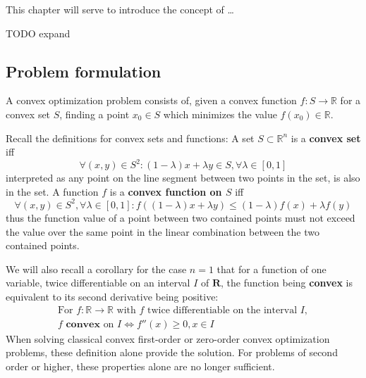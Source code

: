\documentclass[../convex_optimization.tex]{subfiles}
\theoremstyle{definition} \newtheorem{defi}{Def}
\theoremstyle{definition} \newtheorem{prop}{Prop}
\begin{document}
This chapter will serve to introduce the concept of \ldots

TODO expand

\subsection{Problem formulation}
A convex optimization problem consists of, given a convex function
$f: S \to \mathbb R$ for a convex set $S$, finding
a point $x_0 \in S$ which minimizes the value $f(x_0) \in \mathbb R$.

Recall the definitions for convex sets and functions:
A set $S \subset \mathbb R^n$ is a \textbf{convex set} iff
\begin{equation}
    \forall (x, y) \in S^2: (1-\lambda)x + \lambda y \in S,
    \forall \lambda \in [0, 1]
    \label{convex_set}
\end{equation}
interpreted as any point on the line segment between two points in the set,
is also in the set.
A function $f$ is a \textbf{convex function on $S$} iff
\begin{equation}
    \forall (x, y) \in S^2, \forall \lambda \in [0, 1]:
    f((1-\lambda)x + \lambda y) \leq (1-\lambda)f(x) + \lambda f(y)
    \label{convex_function}
\end{equation}
thus the function value of a point between two contained points must
not exceed the value over the same point in the linear combination between the two contained points.

We will also recall a corollary for the case $n=1$ 
that for a function of one variable,
twice differentiable on an interval $I$ of $\mathbf R$,
the function being \textbf{convex} is equivalent to its second derivative
being positive:
\begin{equation} \label{convex_corollary}
\begin{gathered}
    \text{For } f: \mathbb R \to \mathbb R
    \text{ with $f$ twice differentiable on the interval $I$}, \\
f \textbf{ convex}\text{ on } I \iff f''(x) \geq 0, x \in I
\end{gathered}
\end{equation}
When solving classical convex first-order or zero-order convex
optimization problems, these definition alone provide the solution.
For problems of second order or higher, these properties alone are
no longer sufficient.
\end{document}
